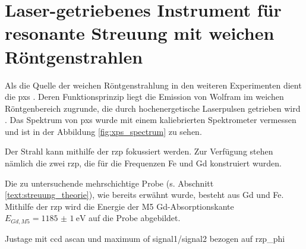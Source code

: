 \chapter{Laser-getriebenes Instrument für resonante Streuung mit weichen Röntgenstrahlen}
\label{text:quelle_roentgen}
Als die Quelle der weichen Röntgenstrahlung in den weiteren Experimenten dient die \gls{pxs} \cite{schick_laser-driven_2021}. Deren Funktionsprinzip liegt die Emission von Wolfram im weichen Röntgenbereich zugrunde, die durch hochenergetische Laserpulsen getrieben wird \cite{mantouvalou_high_2015}. Das Spektrum von \gls{pxs} wurde mit einem kaliebrierten Spektrometer vermessen und ist in der Abbildung \ref{fig:xps_spectrum} zu sehen.

Der Strahl kann mithilfe der \gls{rzp} fokussiert werden. Zur Verfügung stehen nämlich die zwei \gls{rzp}, die für die Frequenzen Fe und Gd konstruiert wurden. 

Die zu untersuchende mehrschichtige Probe (s. Abschnitt \ref{text:streuung_theorie}), wie bereits erwähnt wurde, besteht aus Gd und Fe. Mithilfe der \gls{rzp} wird die Energie der M5 Gd-Absorptionskante $E_{Gd, M5} = \SI{1185(1)}{\eV}$ \cite[Abb. 6(a)]{prieto_x-ray_2005} auf die Probe abgebildet.

Justage mit ccd ascan und maximum of signal1/signal2 bezogen auf rzp\_phi 


